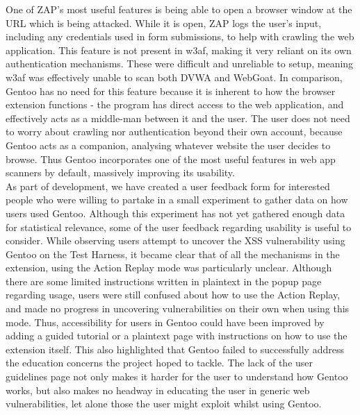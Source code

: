 One of ZAP's most useful features is being able to open a browser window at the URL which is being attacked. While it is open, ZAP logs the user's input, including any credentials used in form submissions, to help with crawling the web application. This feature is not present in w3af, making it very reliant on its own authentication mechanisms. These were difficult and unreliable to setup, meaning w3af was effectively unable to scan both DVWA and WebGoat. In comparison, Gentoo has no need for this feature because it is inherent to how the browser extension functions - the program has direct access to the web application, and effectively acts as a middle-man between it and the user. The user does not need to worry about crawling nor authentication beyond their own account, because Gentoo acts as a companion, analysing whatever website the user decides to browse. Thus Gentoo incorporates one of the most useful features in web app scanners by default, massively improving its usability. \\

As part of development, we have created a user feedback form for interested people who were willing to partake in a small experiment to gather data on how users used Gentoo. Although this experiment has not yet gathered enough data for statistical relevance, some of the user feedback regarding usability is useful to consider. While observing users attempt to uncover the XSS vulnerability using Gentoo on the Test Harness, it became clear that of all the mechanisms in the extension, using the Action Replay mode was particularly unclear. Although there are some limited instructions written in plaintext in the popup page regarding usage, users were still confused about how to use the Action Replay, and made no progress in uncovering vulnerabilities on their own when using this mode. Thus, accessibility for users in Gentoo could have been improved by adding a guided tutorial or a plaintext page with instructions on how to use the extension itself. This also highlighted that Gentoo failed to successfully address the education concerns the project hoped to tackle. The lack of the user guidelines page not only makes it harder for the user to understand how Gentoo works, but also makes no headway in educating the user in generic web vulnerabilities, let alone those the user might exploit whilst using Gentoo.  \\ 






